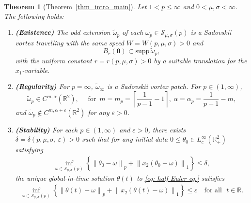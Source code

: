 \documentclass[10pt,a4paper]{amsart}
\newtheorem{theorem}{Theorem}[section]
\theoremstyle{definition}
\theoremstyle{definition}
\numberwithin{equation}{section}
\newcommand{\tld}[1]{\widetilde{#1}}
\newcommand{\supp}{{\mathrm{supp}}\,}
\newcommand{\0}{\emptyset}
\newcommand{\bbR}{\mathbb R}
\newcommand{\calS}{\mathcal S}
\begin{document}
\setcounter{section}{6}
\setcounter{equation}{0}
\setcounter{theorem}{0}
			\begin{theorem}[Theorem~\ref{thm_intro_main}]
				\label{thm_main_1}
				Let $1<p \leq \infty$ and $0<\mu,\sigma<\infty$. The following holds:
				
				\begin{enumerate}[itemsep=1em, topsep=1em]
					\item[(i)] \textbf{(Existence)} The odd extension $\tld{\omega}_p$ of each $\omega_p\in \calS_{\mu,\sigma}(p)$ is a Sadovskii vortex travelling with the same speed $W = W(p, \mu, \sigma) > 0$ and 
					\begin{equation}\label{eq_main_supp}
						B_{r}(\mathbf{0}) \subset \supp \tld{\omega}_p,
					\end{equation}
					with the uniform constant $ r = r(p, \mu, \sigma) >0$ by a suitable translation for the $x_1$-variable. 
					\item[(ii)] \textbf{(Regularity)} For $p=\infty$, $\tld{\omega}_{\infty}$ is a Sadovskii vortex patch. For $p \in (1, \infty)$, 
					\begin{equation}\label{eq_main_regularity}
						\tld{\omega}_p \in C^{m, \alpha}(\bbR^2), \quad \textrm{ for } \, m =m_p = \left\lceil \frac{1}{p-1} - 1 \right\rceil,\ \alpha = \alpha_p =\frac{1}{p-1}-m,
					\end{equation}
					and $\tld{\omega}_p \notin C^{m, \alpha + \varepsilon}(\bbR^2)$ for any $\varepsilon > 0$.
					\item[(iii)] \textbf{(Stability)} For each $p \in (1, \infty)$ and $\varepsilon>0$, there exists $\delta = \delta(p, {\mu, \sigma,\, }   \varepsilon)>0$ such that for any initial data $0 \le \theta_0 \in  L_c^{\infty}(\bbR^2_+)$ satisfying  
					\begin{align}
						\inf_{\omega\in \calS_{\mu,\sigma}(p)}\left\{  \left\| \theta_0-\omega \right\|_{p} 
						+\left\| x_2 \left( \theta_0-\omega \right) \right\|_{1} \right\}   \label{eq: initial}
						\leq  \delta,
					\end{align}
					the unique global-in-time solution $\theta(t)$ to 
                    {\eqref{eq: half Euler eq.}}
                    satisfies
					\begin{align} 
						\inf_{\omega\in \calS_{\mu,\sigma}(p)}\left\{   \left\| \theta \left( t \right)-\omega \right\|_{p}
						+\left\|x_2 \left( \theta \left(t \right)-\omega  \right) \right\|_{1}\right\}
						\leq  \varepsilon \quad \mbox{for all } \,\, t \in \bbR.   \label{eq: stability}
					\end{align} 
                   

\end{enumerate}
\end{theorem}
\end{document}

